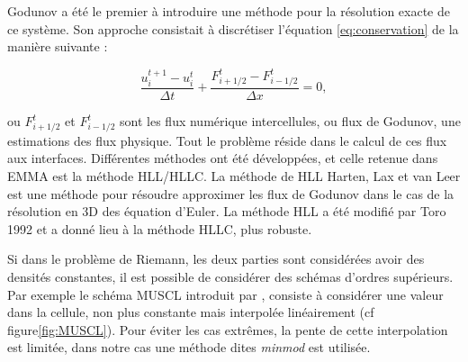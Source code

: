 %
%
%

Godunov \cite{MR0119433} a été le premier à introduire une méthode pour la résolution exacte de ce système.
Son approche consistait à discrétiser l'équation \ref{eq:conservation} de la manière suivante : 

\begin{equation}
\frac{ u^{t+1}_i - u^t_i }{\Delta t} + \frac{ F^t_{i+1/2} - F^t_{i-1/2} }{\Delta x} =0,
\label{eq:rad_solver}
\end{equation}

ou $F^t_{i+1/2}$ et $F^t_{i-1/2}$ sont les flux numérique intercellules, ou flux de Godunov, une estimations des flux physique.
Tout le problème réside dans le calcul de ces flux aux interfaces. %
Différentes méthodes ont été développées, et celle retenue dans EMMA est la méthode HLL/HLLC.
La méthode de HLL Harten, Lax et van Leer  est une méthode pour résoudre approximer les flux de Godunov dans le cas de la résolution en 3D des équation d'Euler.
La méthode HLL a été modifié par Toro 1992 et a donné lieu à la méthode HLLC, plus robuste.


Si dans le problème de Riemann, les deux parties sont considérées avoir des densités constantes, il est possible de considérer des schémas d'ordres supérieurs.
Par exemple le schéma \ac{MUSCL} introduit par \cite{1979JCoPh..32..101V},  consiste à considérer une valeur dans la cellule, non plus constante mais interpolée linéairement (cf figure\ref{fig:MUSCL}).
Pour éviter les cas extrêmes, la pente de cette interpolation est limitée, dans notre cas une méthode dites \textit{minmod} est utilisée.

